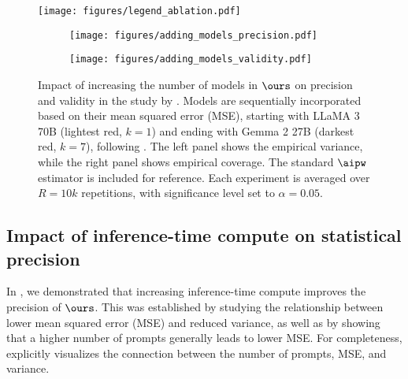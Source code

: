 \begin{figure}[ht!]
 \centering
    \texttt{[image: figures/legend\_ablation.pdf]}\\
    \centering
    \begin{subfigure}{0.35\textwidth}
        \centering
        \texttt{[image: figures/adding\_models\_precision.pdf]}
        \label{fig:adding_models_precision}
    \end{subfigure}
    \hspace{30pt}
    \begin{subfigure}{0.35\textwidth}
        \centering
        \texttt{[image: figures/adding\_models\_validity.pdf]}
        \label{fig:adding_models_validity}

    \end{subfigure}
\caption{\small{Impact of increasing the number of models in $\ours$ on precision and validity in the study by \citet{fahey2023principled}. Models are sequentially incorporated based on their mean squared error (MSE), starting with LLaMA 3 70B (lightest red, $k=1$) and ending with Gemma 2 27B (darkest red, $k=7$), following . The left panel shows the empirical  variance, while the right panel shows empirical coverage. The standard $\aipw$ estimator is included for reference. Each experiment is averaged over $R=10k$ repetitions, with significance level set to $\alpha=0.05$.}}
    \label{fig:adding_models}
\end{figure}







\subsection{Impact of inference-time compute on statistical precision}
\label{apx:ablation_testtime}

In , we demonstrated that increasing inference-time compute improves the precision of $\ours$. This was established by studying the relationship between lower mean squared error (MSE) and reduced variance, as well as by showing that a higher number of prompts generally leads to lower MSE. For completeness,  explicitly visualizes the connection between the number of prompts, MSE, and variance.

